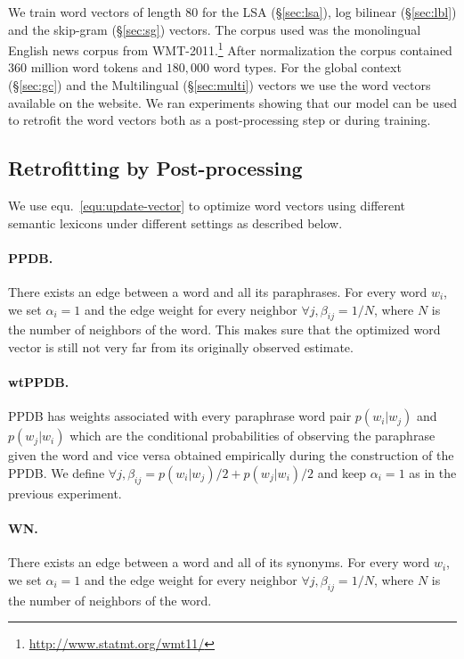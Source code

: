 \documentclass[11pt]{article}
\begin{document}
We train word vectors of length $80$ for the LSA (\S\ref{sec:lsa}), log bilinear (\S\ref{sec:lbl}) 
and the skip-gram (\S\ref{sec:sg}) vectors. The corpus used was the monolingual English news corpus from 
WMT-2011.\footnote{\url{http://www.statmt.org/wmt11/}} After normalization the corpus 
contained $360$ million word tokens and $180,000$ word types. For the global context 
(\S\ref{sec:gc}) and the Multilingual (\S\ref{sec:multi}) vectors
we use the word vectors available on the website.
We ran experiments showing that our model can be used to retrofit the word vectors both
as a post-processing step or during training.

\subsection{Retrofitting by Post-processing}
\label{sec:exp-post-proc}

We use equ.~\ref{equ:update-vector} to optimize word vectors using different 
semantic lexicons under different settings as described below.

\paragraph{PPDB.} There exists an edge between a word and all its paraphrases. For every word $w_i$, we set $\alpha_i = 1$ and the edge weight for every neighbor $\forall j, \beta_{ij} = 1/N$, where $N$ is the number of neighbors of the word. This makes sure that the optimized word vector is still not very far from its originally observed estimate.

\paragraph{wtPPDB.} PPDB has weights associated with every paraphrase word pair $p(w_i | w_j)$ and $p(w_j |w_i)$ which are the conditional probabilities of 
observing the paraphrase given the word and vice versa obtained empirically during the construction of the PPDB. We define $\forall j, \beta_{ij} = p(w_i | w_j)/2 + p(w_j |w_i)/2$ and keep $\alpha_i = 1$ as in the previous experiment.

\paragraph{WN.} There exists an edge between a word and all of its synonyms. 
For every word $w_i$, we set $\alpha_i = 1$ and the edge weight for every neighbor 
$\forall j, \beta_{ij} = 1/N$, where $N$ is the number of neighbors of the word. 
\end{document}
